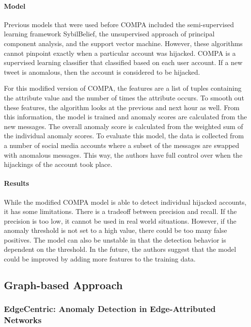 \documentclass[11pt, oneside]{article}   	%
\begin{document}
\paragraph{Model}
\quad

\quad Previous models that were used before COMPA included the semi-supervised learning framework SybilBelief, the unsupervised approach of principal component analysis, and the support vector machine.
However, these algorithms cannot pinpoint exactly when a particular account was hijacked.
COMPA is a supervised learning classifier that classified based on each user account.
If a new tweet is anomalous, then the account is considered to be hijacked.

\quad For this modified version of COMPA, the features are a list of tuples containing the attribute value and the number of times the attribute occurs.
To smooth out these features, the algorithm looks at the previous and next hour as well.
From this information, the model is trained and anomaly scores are calculated from the new messages.
The overall anomaly score is calculated from the weighted sum of the individual anomaly scores.
To evaluate this model, the data is collected from a number of social media accounts where a subset of the messages are swapped with anomalous messages.
This way, the authors have full control over when the hijackings of the account took place.

\paragraph{Results}
\quad

\quad While the modified COMPA model is able to detect individual hijacked accounts, it has some limitations.
There is a tradeoff between precision and recall.
If the precision is too low, it cannot be used in real world situations.
However, if the anomaly threshold is not set to a high value, there could be too many false positives.
The model can also be unstable in that the detection behavior is dependent on the threshold.
In the future, the authors suggest that the model could be improved by adding more features to the training data.

\subsection{Graph-based Approach}
\subsubsection{EdgeCentric: Anomaly Detection in Edge-Attributed Networks}
\end{document}
